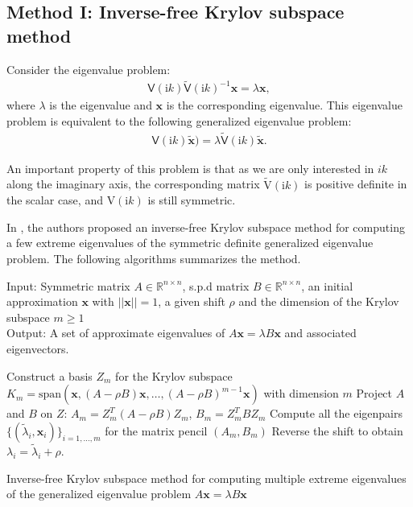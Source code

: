 \subsection{Method I: Inverse-free Krylov subspace method}

Consider the eigenvalue problem: 
\begin{align} \label{EP}
    \mathsf{V}(\mathrm{i}k)\tilde{\mathsf{V}}(\mathrm{i}k)^{-1}\boldsymbol{x} = \lambda\boldsymbol{x},
\end{align}
where $\lambda$ is the eigenvalue and $\boldsymbol{x}$ is the corresponding eigenvalue. This eigenvalue problem is equivalent to the following generalized eigenvalue problem:
\begin{align}\label{GEP}
    \mathsf{V}(\mathrm{i}k)\tilde{\boldsymbol{x}}) = \lambda \tilde{\mathsf{V}}(\mathrm{i}k)\tilde{\boldsymbol{x}}.
\end{align}


An important property of this problem is that as we are only interested in $ik$ along the imaginary axis, the corresponding matrix $\tilde{\mathrm{V}}(\mathrm{i}k)$ is positive definite in the scalar case,
and $\mathrm{V}(\mathrm{i}k)$ is still symmetric.

In \cite{golub2002inverse}\cite{money2005algorithm},
the authors proposed an inverse-free Krylov subspace method for computing a few extreme eigenvalues of the symmetric definite generalized eigenvalue problem.
The following algorithms summarizes the method.

\begin{algorithm}[H]
    \SetAlgoLined
    Input: Symmetric matrix $A\in\mathbb{R}^{n\times n}$, s.p.d matrix $B\in\mathbb{R}^{n\times n}$, an initial approximation $\boldsymbol{x}$ with $||\boldsymbol{x}|| = 1$,
    a given shift $\rho$ and the dimension of the Krylov subspace $m\geq 1$\\
    Output: A set of approximate eigenvalues of $A\boldsymbol{x} = \lambda B\boldsymbol{x}$ and associated eigenvectors.\\
    \begin{algorithmic}[1]
        
        \STATE Construct a basis $Z_{m}$ for the Krylov subspace $K_{m} = \text{span}(\boldsymbol{x}, (A - \rho B)\boldsymbol{x}, \dots, (A - \rho B)^{m-1}\boldsymbol{x})$ with dimension $m$
        \STATE Project $A$ and $B$ on $Z$: $A_{m} = Z_{m}^{T}(A - \rho B)Z_{m}$, $B_{m} = Z_{m}^{T}BZ_{m}$
        \STATE Compute all the eigenpairs $\{(\tilde{\lambda}_{i}, \boldsymbol{x}_{i})\}_{i = 1, \dots, m}$ for the matrix pencil $(A_{m}, B_{m})$
        \STATE Reverse the shift to obtain $\lambda_{i} = \tilde{\lambda}_{i} + \rho$.
        \end{algorithmic}
    \caption{Inverse-free Krylov subspace method for computing multiple extreme eigenvalues of the generalized eigenvalue problem $A\boldsymbol{x} = \lambda B\boldsymbol{x}$}
    \label{Alg for computing the evals kry}
    \end{algorithm}
   
